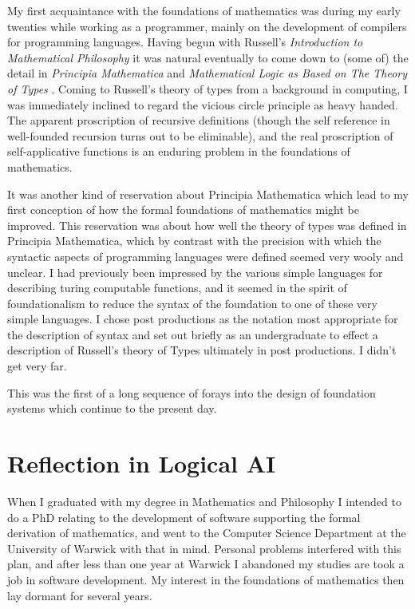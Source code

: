 \documentclass[10pt,titlepage]{book}
\begin{document}
My first acquaintance with the foundations of mathematics was during my early twenties while working as a programmer, mainly on the development of compilers for programming languages.
Having begun with Russell's \emph{Introduction to Mathematical Philosophy} \cite{russell10} it was natural eventually to come down to (some of) the detail in \emph{Principia Mathematica} \cite{russell10} and \emph{Mathematical Logic as Based on The Theory of Types} \cite{russell08}.
Coming to Russell's theory of types from a background in computing, I was immediately inclined to regard the vicious circle principle as heavy handed.
The apparent proscription of recursive definitions (though the self reference in well-founded recursion turns out to be eliminable), and the real proscription of self-applicative functions is an enduring problem in the foundations of mathematics.

It was another kind of reservation about Principia Mathematica which lead to my first conception of how the formal foundations of mathematics might be improved.
This reservation was about how well the theory of types was defined in Principia Mathematica, which by contrast with the precision with which the syntactic aspects of programming languages were defined seemed very wooly and unclear.
I had previously been impressed by the various simple languages for describing turing computable functions, and it seemed in the spirit of foundationalism to reduce the syntax of the foundation to one of these very simple languages.
I chose post productions as the notation most appropriate for the description of syntax and set out briefly as an undergraduate to effect a description of Russell's theory of Types ultimately in post productions.
I didn't get very far.

This was the first of a long sequence of forays into the design of foundation systems which continue to the present day.

\section{Reflection in Logical AI}

When I graduated with my degree in Mathematics and Philosophy I intended to do a PhD relating to the development of software supporting the formal derivation of mathematics, and went to the Computer Science Department at the University of Warwick with that in mind.
Personal problems interfered with this plan, and after less than one year at Warwick I abandoned my studies are took a job in software development.
My interest in the foundations of mathematics then lay dormant for several years.
\end{document}
